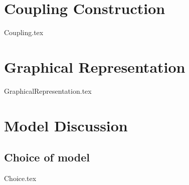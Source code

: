 

\chapter{Coupling Construction}\label{ch:Couplers}
{Coupling.tex}


\newpage
\chapter{Graphical Representation}
{GraphicalRepresentation.tex}



\chapter{Model Discussion}\label{ch:modelDis}
\section{Choice of model}\label{sec:Choice}
{Choice.tex}